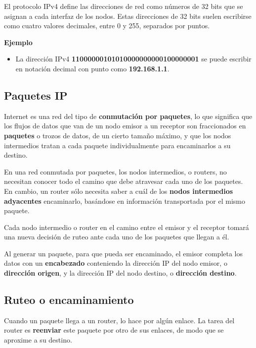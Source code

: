 \documentclass[spanish,A4,]{article}
\begin{document}
El protocolo IPv4 define las direcciones de red como números de 32 bits
que se asignan a cada interfaz de los nodos. Estas direcciones de 32
bits suelen escribirse como cuatro valores decimales, entre 0 y 255,
separados por puntos.

\textbf{Ejemplo}

\begin{itemize}
\itemsep1pt\parskip0pt
\item
  La dirección IPv4 \textbf{11000000101010000000000100000001} se puede
  escribir en notación decimal con punto como \textbf{192.168.1.1}.
\end{itemize}

\subsection{Paquetes IP}\label{paquetes-ip}

Internet es una red del tipo de \textbf{conmutación por paquetes}, lo
que significa que los flujos de datos que van de un nodo emisor a un
receptor son fraccionados en \textbf{paquetes} o trozos de datos, de un
cierto tamaño máximo, y que los nodos intermedios tratan a cada paquete
individualmente para encaminarlos a su destino.

En una red conmutada por paquetes, los nodos intermedios, o routers, no
necesitan conocer todo el camino que debe atravesar cada uno de los
paquetes. En cambio, un router sólo necesita saber a cuál de los
\textbf{nodos intermedios adyacentes} encaminarlo, basándose en
información transportada por el mismo paquete.

Cada nodo intermedio o router en el camino entre el emisor y el receptor
tomará una nueva decisión de ruteo ante cada uno de los paquetes que
llegan a él.

Al generar un paquete, para que pueda ser encaminado, el emisor completa
los datos con un \textbf{encabezado} conteniendo la dirección IP del
nodo emisor, o \textbf{dirección origen}, y la dirección IP del nodo
destino, o \textbf{dirección destino}.

\subsection{Ruteo o encaminamiento}\label{ruteo-o-encaminamiento}

Cuando un paquete llega a un router, lo hace por algún enlace. La tarea
del router es \textbf{reenviar} este paquete por otro de sus enlaces, de
modo que se aproxime a su destino.
\end{document}
